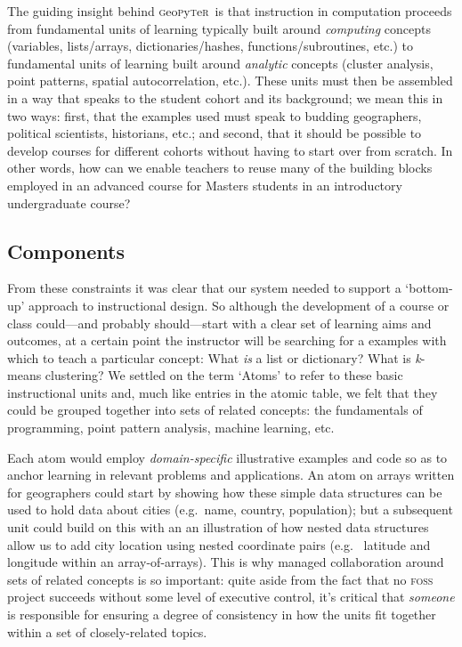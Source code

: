 \documentclass[letter, 11pt]{article}
\newcommand{\gp}{\textsc{g}eo\textsc{p}y\textsc{t}e\textsc{r}~\/}
\newcommand{\eg}{e.g.~\/}
\begin{document}
The guiding insight behind \gp is that instruction in computation proceeds from
fundamental units of learning typically built around \textit{computing} concepts
(variables, lists/arrays, dictionaries/hashes, functions/subroutines, etc.) to
fundamental units of learning built around \textit{analytic} concepts (cluster
analysis, point patterns, spatial autocorrelation, etc.). These units must then
be assembled in a way that speaks to the student cohort and its background; we
mean this in two ways: first, that the examples used must speak to budding
geographers, political scientists, historians, etc.; and second, that it should
be possible to develop courses for different cohorts without having to start
over from scratch. In other words, how can we enable teachers to reuse many of
the building blocks employed in an advanced course for Masters students in an
introductory undergraduate course?

\subsection{Components}\label{components}

From these constraints it was clear that our system needed to support a
`bottom-up' approach to instructional design. So although the development of a
course or class could---and probably should---start with a clear set of learning
aims and outcomes, at a certain point the instructor will be searching for a
examples with which to teach a particular concept: What \emph{is} a list or
dictionary? What is \textit{k}-means clustering? We settled on the term `Atoms'
to refer to these basic instructional units and, much like entries in the atomic
table, we felt that they could be grouped together into sets of related
concepts: the fundamentals of programming, point pattern analysis, machine
learning, etc.

Each atom would employ \emph{domain-specific} illustrative examples and code so
as to anchor learning in relevant problems and applications. An atom on arrays
written for geographers could start by showing how these simple data structures
can be used to hold data about cities (\eg name, country, population); but a
subsequent unit could build on this with an an illustration of how nested data
structures allow us to add city location using nested coordinate pairs (\eg
latitude and longitude within an array-of-arrays). This is why managed
collaboration around sets of related concepts is so important: quite aside from
the fact that no \textsc{foss} project succeeds without some level of executive
control, it's critical that \textit{someone} is responsible for ensuring a
degree of consistency in how the units fit together within a set of
closely-related topics.
\end{document}
